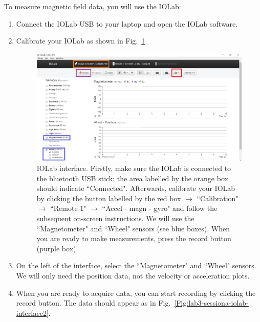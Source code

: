 \documentclass[12pt]{report}
\begin{document}
To measure magnetic field data, you will use the IOLab:
\begin{enumerate}
\item Connect the IOLab USB to your laptop and open the IOLab software.
\item Calibrate your IOLab as shown in Fig.~\ref{Fig:lab3-sessiona-interface1} 

\begin{figure}[h]
\centering
\includegraphics[width=0.8 \textwidth]{lab3-sessiona-interface1}
\caption{IOLab interface. Firstly, make sure the IOLab is connected to the bluetooth USB stick: the area labelled by the orange box should indicate ``Connected". Afterwards, calibrate your IOLab by clicking the button labelled by the red box $\rightarrow$ ``Calibration" $\rightarrow$ ``Remote 1" $\rightarrow$ ``Accel - magn - gyro" and follow the subsequent on-screen instructions. We will use the ``Magnetometer" and ``Wheel" sensors (see blue boxes). When you are ready to make measurements, press the record button (purple box). }
\label{Fig:lab3-sessiona-interface1}
\end{figure}

\item On the left of the interface, select the ``Magnetometer" and ``Wheel" sensors. We will only need the position data, not the velocity or acceleration plots.

\item When you are ready to acquire data, you can start recording by clicking the record button. The data should appear as in Fig.~\ref{Fig:lab3-sessiona-iolab-interface2}.
\end{enumerate}
\end{document}
